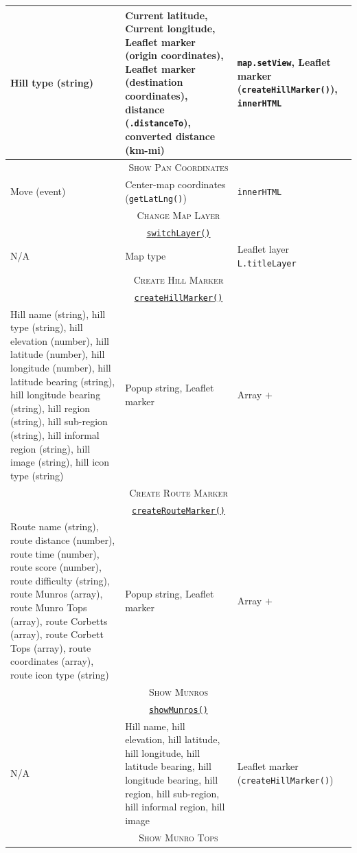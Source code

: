 \documentclass[11pt, english]{article}
\begin{document}
\begin{center}
\begin{longtable}{p{4cm}p{6cm}p{2cm}}
		Hill type (string) & Current latitude, Current longitude, Leaflet marker (origin coordinates), Leaflet marker (destination coordinates), distance (\texttt{.distanceTo}), converted distance (km-mi) & \texttt{map.setView}, Leaflet marker (\texttt{createHillMarker()}), \texttt{innerHTML}\\
		\hline
		\multicolumn{3}{c}{\textsc{Show Pan Coordinates}}\\
		\hline
		Move (event) & Center-map coordinates (\texttt{getLatLng()}) & \texttt{innerHTML}\\
		\hline
		\multicolumn{3}{c}{\textsc{Change Map Layer}}\\
		\hline
		\multicolumn{3}{c}{\underline{\texttt{switchLayer()}}}\\
		N/A & Map type & Leaflet layer \texttt{L.titleLayer}\\
		\hline
		\multicolumn{3}{c}{\textsc{Create Hill Marker}}\\
		\hline
		\multicolumn{3}{c}{\underline{\texttt{createHillMarker()}}}\\
		Hill name (string), hill type (string), hill elevation (number), hill latitude (number), hill longitude (number), hill latitude bearing (string), hill longitude bearing (string), hill region (string), hill sub-region (string), hill informal region (string), hill image (string), hill icon type (string) & Popup string, Leaflet marker & Array $+$\\
		\hline
		\multicolumn{3}{c}{\textsc{Create Route Marker}}\\
		\hline
		\multicolumn{3}{c}{\underline{\texttt{createRouteMarker()}}}\\
		Route name (string), route distance (number), route time (number), route score (number), route difficulty (string), route Munros (array), route Munro Tops (array), route Corbetts (array), route Corbett Tops (array), route coordinates (array), route icon type (string) & Popup string, Leaflet marker & Array $+$\\
		\hline
		\multicolumn{3}{c}{\textsc{Show Munros}}\\
		\hline
		\multicolumn{3}{c}{\underline{\texttt{showMunros()}}}\\
		N/A & Hill name, hill elevation, hill latitude, hill longitude, hill latitude bearing, hill longitude bearing, hill region, hill sub-region, hill informal region, hill image & Leaflet marker (\texttt{createHillMarker()})\\
		\hline
		\multicolumn{3}{c}{\textsc{Show Munro Tops}}\\

\end{longtable}
\end{center}
\end{document}
